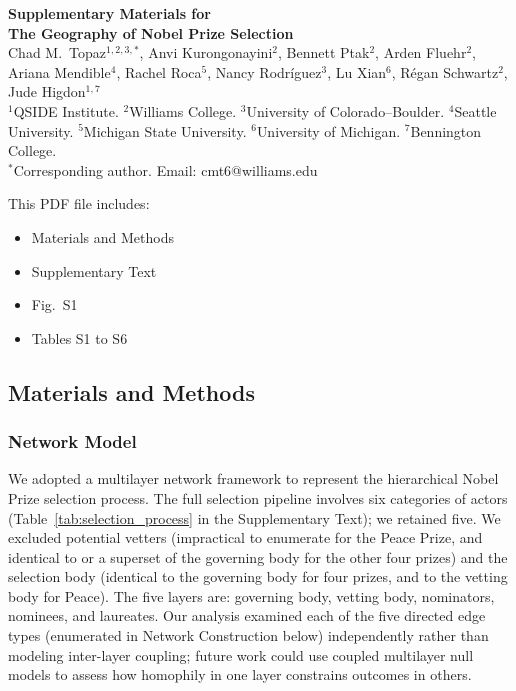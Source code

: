 \documentclass[12pt]{article}
\def\scititle{The Geography of Nobel Prize Selection}
\begin{document}
\begin{center}
{\large\textbf{Supplementary Materials for}}\\[6pt]
{\large\textbf{\scititle}}\\[12pt]
Chad M.\ Topaz$^{1,2,3,\ast}$,
Anvi Kurongonayini$^{2}$,
Bennett Ptak$^{2}$,
Arden Fluehr$^{2}$,
Ariana Mendible$^{4}$,
Rachel Roca$^{5}$,
Nancy Rodr\'{i}guez$^{3}$,
Lu Xian$^{6}$,
R\'{e}gan Schwartz$^{2}$,
Jude Higdon$^{1,7}$\\[6pt]
{\small $^{1}$QSIDE Institute.
$^{2}$Williams College.
$^{3}$University of Colorado--Boulder.
$^{4}$Seattle University.
$^{5}$Michigan State University.
$^{6}$University of Michigan.
$^{7}$Bennington College.}\\[4pt]
{\small $^\ast$Corresponding author. Email: cmt6@williams.edu}
\end{center}

\bigskip

\noindent This PDF file includes:
\begin{itemize}
\item Materials and Methods
\item Supplementary Text
\item Fig.\ S1
\item Tables S1 to S6
\end{itemize}

\clearpage

\subsection*{Materials and Methods}

\subsubsection*{Network Model}

We adopted a multilayer network framework \cite{Kivela2014} to represent the hierarchical Nobel Prize selection process. The full selection pipeline involves six categories of actors (Table~\ref{tab:selection_process} in the Supplementary Text); we retained five. We excluded potential vetters (impractical to enumerate for the Peace Prize, and identical to or a superset of the governing body for the other four prizes) and the selection body (identical to the governing body for four prizes, and to the vetting body for Peace). The five layers are: governing body, vetting body, nominators, nominees, and laureates. Our analysis examined each of the five directed edge types (enumerated in Network Construction below) independently rather than modeling inter-layer coupling; future work could use coupled multilayer null models to assess how homophily in one layer constrains outcomes in others.
\end{document}
